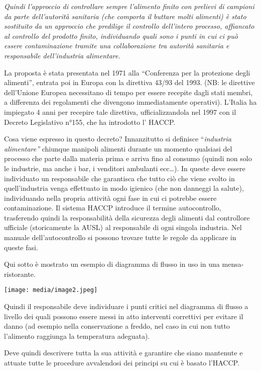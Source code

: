 \documentclass[]{article}
\begin{document}
\emph{Quindi l'approccio di controllare sempre l'alimento finito con
prelievi di campioni da parte dell'autorità sanitaria (che comporta il
buttare molti alimenti) è stato sostituito da un approccio che predilige
il controllo dell'intero processo, affiancato al controllo del prodotto
finito, individuando quali sono i punti in cui ci può essere
contaminazione tramite una collaborazione tra autorità sanitaria e
responsabile dell'industria alimentare.}

La proposta è stata presentata nel 1971 alla ``Conferenza per la
protezione degli alimenti'', entrata poi in Europa con la direttiva
43/93 del 1993. (NB: le direttive dell'Unione Europea necessitano di
tempo per essere recepite dagli stati membri, a differenza dei
regolamenti che divengono immediatamente operativi). L'Italia ha
impiegato 4 anni per recepire tale direttiva, ufficializzandola nel 1997
con il Decreto Legislativo n°155, che ha introdotto l' HACCP.

Cosa viene espresso in questo decreto? Innanzitutto si definisce
``\emph{industria alimentare''} chiunque manipoli alimenti durante un
momento qualsiasi del processo che parte dalla materia prima e arriva
fino al consumo (quindi non solo le industrie, ma anche i bar, i
venditori ambulanti ecc\ldots{}). In queste deve essere individuato un
responsabile che garantisca che tutto ciò che viene svolto in
quell'industria venga effettuato in modo igienico (che non danneggi la
salute), individuando nella propria attività ogni fase in cui ci
potrebbe essere contaminazione. Il sistema HACCP introduce il termine
autocontrollo, trasferendo quindi la responsabilità della sicurezza
degli alimenti dal controllore ufficiale (storicamente la AUSL) al
responsabile di ogni singola industria. Nel manuale dell'autocontrollo
si possono trovare tutte le regole da applicare in queste fasi.

Qui sotto è mostrato un esempio di diagramma di flusso in uso in una
mensa-ristorante.

\texttt{[image: media/image2.jpeg]}

Quindi il responsabile deve individuare i punti critici nel diagramma di
flusso a livello dei quali possono essere messi in atto interventi
correttivi per evitare il danno (ad esempio nella conservazione a
freddo, nel caso in cui non tutto l'alimento raggiunga la temperatura
adeguata).

Deve quindi descrivere tutta la sua attività e garantire che siano
mantenute e attuate tutte le procedure avvalendosi dei principi su cui è
basato l'HACCP.
\end{document}
